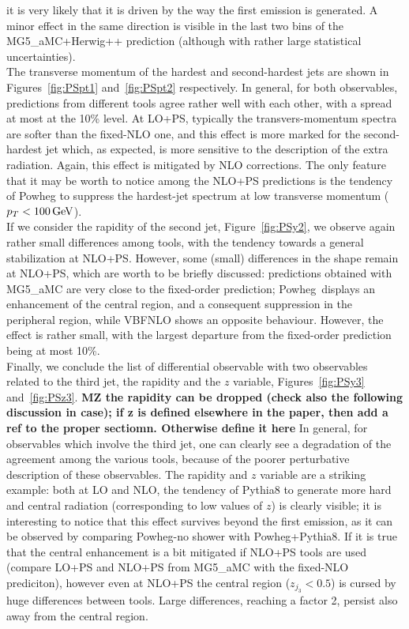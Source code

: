 it is very likely that it is driven by the way the first emission is generated. A minor effect in the same direction is visible in the last two bins of the 
{\sc MG5\_aMC+Herwig++} prediction (although with rather large statistical uncertainties).\\
The transverse momentum of the hardest and second-hardest jets are shown in Figures~\ref{fig:PSpt1} and~\ref{fig:PSpt2} respectively. In general, for both observables, 
predictions from different tools agree rather well with each other, with a spread at most at the 10\% level. At LO+PS, typically the transvers-momentum spectra are softer than
the fixed-NLO one, and this effect is more marked for the second-hardest jet which, as expected, is more sensitive to the description of the extra radiation. Again, this
effect is mitigated by NLO corrections. The only feature that it may be worth to notice among the NLO+PS predictions is the tendency of {\sc Powheg} to suppress the
hardest-jet spectrum at low transverse momentum ($p_T<100 \,\text{GeV}$).\\
If we consider the rapidity of the second jet, Figure~\ref{fig:PSy2}, we observe again rather small differences among tools, with the tendency towards a general 
stabilization at NLO+PS. However, some (small) differences in the shape remain at NLO+PS, which are worth to be briefly discussed: predictions 
obtained with {\sc MG5\_aMC} are very close to the fixed-order prediction; {\sc Powheg}\ displays an enhancement of the central region, and a consequent suppression in the
peripheral region, while {\sc VBFNLO} shows an opposite behaviour. However, the effect is rather small, with the largest departure from the fixed-order prediction being 
at most 10\%.\\
Finally, we conclude the list of differential observable with two observables related to the third jet, the rapidity and the $z$ variable, Figures~\ref{fig:PSy3} and~\ref{fig:PSz3}. 
{\bf MZ the rapidity can be dropped (check also the following discussion in case); if z is defined elsewhere in the paper, then add a ref to the proper sectiomn. Otherwise define it here} 
In general, for observables which involve the third jet, one 
can clearly see a degradation of the agreement among the various tools, because of the poorer perturbative description of these observables. The rapidity and $z$ variable
are a striking example: both at LO and NLO, the tendency of {\sc Pythia8} to generate more hard and central radiation (corresponding to low values of $z$) 
is clearly visible; it is interesting to notice that
this effect survives beyond the first emission, as it can be observed by comparing {\sc Powheg-no shower} with {\sc Powheg+Pythia8}. If it is true that the central enhancement
is a bit mitigated if NLO+PS tools are used (compare LO+PS and NLO+PS from {\sc MG5\_aMC} with the fixed-NLO prediciton), however even at NLO+PS the central region 
($z_{j_3}<0.5$) is cursed by huge differences between tools. Large differences, reaching a factor 2, persist also away from the central region. \\

